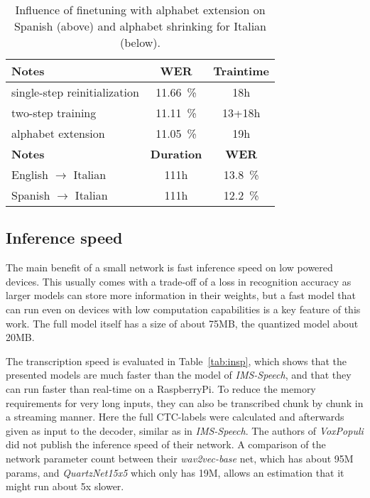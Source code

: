 \begin{table}[H]
	\caption{Influence of finetuning with alphabet extension on Spanish (above) and alphabet shrinking for Italian (below).}
	\label{tab:iae}
	\centering
	\begin{tabular}{lcc}
		\toprule
		\textbf{Notes} & \textbf{WER} & \textbf{Traintime} \\
		\midrule
		single-step reinitialization & \SI{11.66}{\percent} & 18h \\
		two-step training & \SI{11.11}{\percent} & 13+18h \\
		
		alphabet extension & \SI{11.05}{\percent} & 19h \\ 
		\midrule
		\textbf{Notes}  & \textbf{Duration} & \textbf{WER} \\
		\midrule
		English $\rightarrow$ Italian & 111h  & \SI{13.8}{\percent} \\
		Spanish $\rightarrow$ Italian & 111h  & \SI{12.2}{\percent} \\
		\bottomrule
	\end{tabular}
\end{table}

\subsection{Inference speed}
The main benefit of a small network is fast inference speed on low powered devices. This usually comes with a trade-off of a loss in recognition accuracy as larger models can store more information in their weights, but a fast model that can run even on devices with low computation capabilities is a key feature of this work. The full model itself has a size of about 75MB, the quantized model about 20MB.

The transcription speed is evaluated in Table~\ref{tab:insp}, which shows that the presented models are much faster than the model of \textit{IMS-Speech}, and that they can run faster than real-time on a RaspberryPi. To reduce the memory requirements for very long inputs, they can also be transcribed chunk by chunk in a streaming manner. Here the full CTC-labels were calculated and afterwards given as input to the decoder, similar as in \textit{IMS-Speech}.
The authors of \textit{VoxPopuli} did not publish the inference speed of their network. A comparison of the network parameter count between their \textit{wav2vec-base} net, which has about 95M params, and \textit{QuartzNet15x5} which only has 19M, allows an estimation that it might run about 5x slower.

